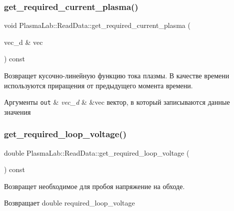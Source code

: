 \subsubsection{\texorpdfstring{get\+\_\+required\+\_\+current\+\_\+plasma()}{get\_required\_current\_plasma()}}
{\footnotesize\ttfamily void Plasma\+Lab\+::\+Read\+Data\+::get\+\_\+required\+\_\+current\+\_\+plasma (\begin{DoxyParamCaption}\item[{vec\+\_\+d \&}]{vec }\end{DoxyParamCaption}) const\hspace{0.3cm}{\ttfamily [inline]}}

Возвращет кусочно-\/линейную функцию тока плазмы. В качестве времени используются приращения от предыдущего момента времени. 
\begin{DoxyParams}[1]{Аргументы}
\mbox{\tt out}  & {\em vec\+\_\+d} & \&vec вектор, в который записываются данные значения \\
\hline
\end{DoxyParams}
\mbox{\label{class_plasma_lab_1_1_read_data_abf6cf9dadaa1c32c7f2bd821c14a253a}} 
\subsubsection{\texorpdfstring{get\+\_\+required\+\_\+loop\+\_\+voltage()}{get\_required\_loop\_voltage()}}
{\footnotesize\ttfamily double Plasma\+Lab\+::\+Read\+Data\+::get\+\_\+required\+\_\+loop\+\_\+voltage (\begin{DoxyParamCaption}{ }\end{DoxyParamCaption}) const\hspace{0.3cm}{\ttfamily [inline]}}

Возвращет необходимое для пробоя напряжение на обходе. \begin{DoxyReturn}{Возвращает}
double required\+\_\+loop\+\_\+voltage 
\end{DoxyReturn}
\mbox{\label{class_plasma_lab_1_1_read_data_af4c5e230319f80f43117bc0deb1b9286}} 
